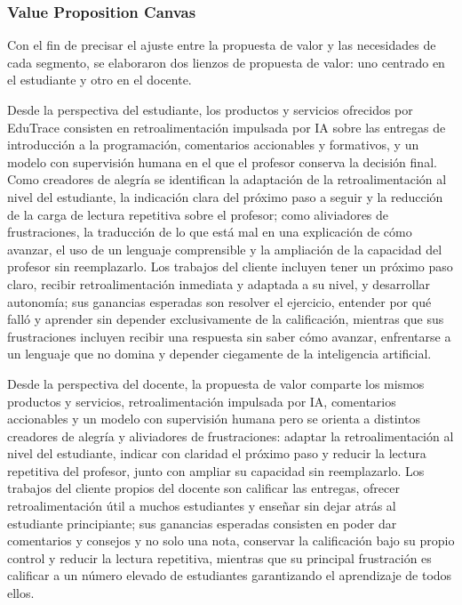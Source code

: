 \documentclass[letterpaper, 10 pt, conference]{ieeeconf}
\begin{document}
\subsubsection{Value Proposition Canvas}
Con el fin de precisar el ajuste entre la propuesta de valor y las necesidades de cada segmento, se elaboraron dos lienzos de propuesta de valor: uno centrado en el estudiante y otro en el docente.

Desde la perspectiva del estudiante, los productos y servicios ofrecidos por EduTrace consisten en retroalimentación impulsada por IA sobre las entregas de introducción a la programación, comentarios accionables y formativos, y un modelo con supervisión humana en el que el profesor conserva la decisión final. Como creadores de alegría se identifican la adaptación de la retroalimentación al nivel del estudiante, la indicación clara del próximo paso a seguir y la reducción de la carga de lectura repetitiva sobre el profesor; como aliviadores de frustraciones, la traducción de lo que está mal en una explicación de cómo avanzar, el uso de un lenguaje comprensible y la ampliación de la capacidad del profesor sin reemplazarlo. Los trabajos del cliente incluyen tener un próximo paso claro, recibir retroalimentación inmediata y adaptada a su nivel, y desarrollar autonomía; sus ganancias esperadas son resolver el ejercicio, entender por qué falló y aprender sin depender exclusivamente de la calificación, mientras que sus frustraciones incluyen recibir una respuesta sin saber cómo avanzar, enfrentarse a un lenguaje que no domina y depender ciegamente de la inteligencia artificial.

Desde la perspectiva del docente, la propuesta de valor comparte los mismos productos y servicios, retroalimentación impulsada por IA, comentarios accionables y un modelo con supervisión humana pero se orienta a distintos creadores de alegría y aliviadores de frustraciones: adaptar la retroalimentación al nivel del estudiante, indicar con claridad el próximo paso y reducir la lectura repetitiva del profesor, junto con ampliar su capacidad sin reemplazarlo. Los trabajos del cliente propios del docente son calificar las entregas, ofrecer retroalimentación útil a muchos estudiantes y enseñar sin dejar atrás al estudiante principiante; sus ganancias esperadas consisten en poder dar comentarios y consejos y no solo una nota, conservar la calificación bajo su propio control y reducir la lectura repetitiva, mientras que su principal frustración es calificar a un número elevado de estudiantes garantizando el aprendizaje de todos ellos.
\end{document}
